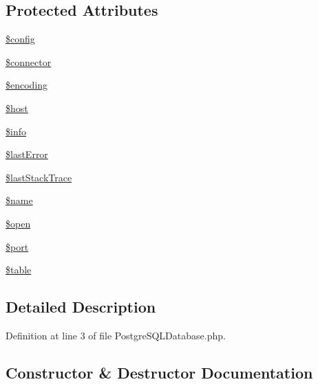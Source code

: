 \subsection*{Protected Attributes}
\begin{DoxyCompactItemize}
\item 
\hyperlink{class_postgre_s_q_l_database_a49c7011be9c979d9174c52a8b83e5d8e}{\$config}
\item 
\hyperlink{class_postgre_s_q_l_database_a7c7a1968b87fd4d016e364b27b7a3d7d}{\$connector}
\item 
\hyperlink{class_postgre_s_q_l_database_aee271b7ce67fbe00b9976e6c347cbfbf}{\$encoding}
\item 
\hyperlink{class_postgre_s_q_l_database_a711797613cb863ca0756df789c396bf2}{\$host}
\item 
\hyperlink{class_postgre_s_q_l_database_ae19722790c6683980bbf0af8572f26ab}{\$info}
\item 
\hyperlink{class_postgre_s_q_l_database_a6cb6be70a528323568af007db6a3885e}{\$last\+Error}
\item 
\hyperlink{class_postgre_s_q_l_database_a12ff8f78a47e0fa691355a485c2e696a}{\$last\+Stack\+Trace}
\item 
\hyperlink{class_postgre_s_q_l_database_ab2fc40d43824ea3e1ce5d86dee0d763b}{\$name}
\item 
\hyperlink{class_postgre_s_q_l_database_a4269f690c0554ecb1deec21b80f321dc}{\$open}
\item 
\hyperlink{class_postgre_s_q_l_database_aa0787efab4b22e8a212882f3409d4c77}{\$port}
\item 
\hyperlink{class_postgre_s_q_l_database_ae8876a14058f368335baccf35af4a22b}{\$table}
\end{DoxyCompactItemize}


\subsection{Detailed Description}


Definition at line 3 of file Postgre\+S\+Q\+L\+Database.\+php.



\subsection{Constructor \& Destructor Documentation}
\hypertarget{class_postgre_s_q_l_database_a522739237db8d43369172cfe07bf7b85}{}
